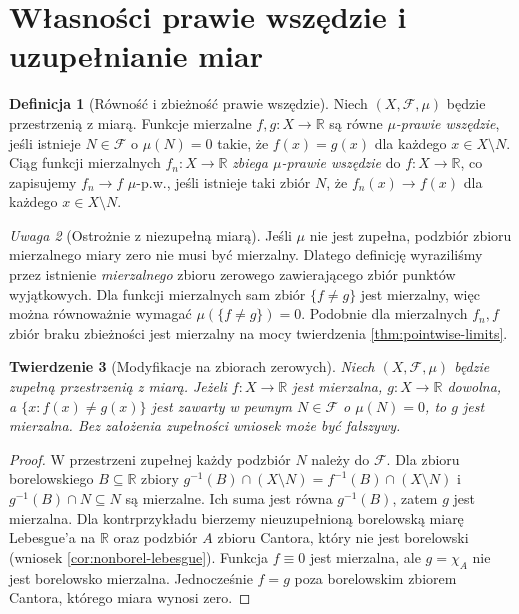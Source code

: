 \documentclass[11pt,a4paper,oneside]{book}
\numberwithin{equation}{chapter}
\theoremstyle{plain}
\newtheorem{twierdzenie}{Twierdzenie}[chapter]
\theoremstyle{definition}
\newtheorem{definicja}[twierdzenie]{Definicja}
\theoremstyle{remark}
\newtheorem{uwaga}[twierdzenie]{Uwaga}
\begin{document}
\section{Własności prawie wszędzie i uzupełnianie miar}

\begin{definicja}[Równość i zbieżność prawie wszędzie]
\label{def:ae-functions}
Niech $(X,\mathcal F,\mu)$ będzie przestrzenią z miarą.
Funkcje mierzalne $f,g:X\to\mathbb R$ są równe
\emph{$\mu$-prawie wszędzie}, jeśli istnieje
$N\in\mathcal F$ o $\mu(N)=0$ takie, że
$f(x)=g(x)$ dla każdego $x\in X\setminus N$.
Ciąg funkcji mierzalnych $f_n:X\to\mathbb R$
\emph{zbiega $\mu$-prawie wszędzie} do $f:X\to\mathbb R$,
co zapisujemy $f_n\to f$ $\mu$-p.w., jeśli istnieje
taki zbiór $N$, że $f_n(x)\to f(x)$ dla każdego
$x\in X\setminus N$.
\end{definicja}

\begin{uwaga}[Ostrożnie z niezupełną miarą]
Jeśli $\mu$ nie jest zupełna, podzbiór zbioru
mierzalnego miary zero nie musi być mierzalny.
Dlatego definicję wyraziliśmy przez istnienie
\emph{mierzalnego} zbioru zerowego zawierającego
zbiór punktów wyjątkowych. Dla funkcji mierzalnych
sam zbiór $\{f\ne g\}$ jest mierzalny, więc można
równoważnie wymagać $\mu(\{f\ne g\})=0$.
Podobnie dla mierzalnych $f_n,f$ zbiór braku
zbieżności jest mierzalny na mocy twierdzenia
\ref{thm:pointwise-limits}.
\end{uwaga}

\begin{twierdzenie}[Modyfikacje na zbiorach zerowych]
\label{thm:null-modifications}
Niech $(X,\mathcal F,\mu)$ będzie \emph{zupełną}
przestrzenią z miarą. Jeżeli $f:X\to\mathbb R$
jest mierzalna, $g:X\to\mathbb R$ dowolna,
a $\{x:f(x)\ne g(x)\}$ jest zawarty w pewnym
$N\in\mathcal F$ o $\mu(N)=0$, to $g$ jest mierzalna.
Bez założenia zupełności wniosek może być fałszywy.
\end{twierdzenie}
\begin{proof}
W przestrzeni zupełnej każdy podzbiór $N$ należy
do $\mathcal F$. Dla zbioru borelowskiego
$B\subseteq\mathbb R$ zbiory
$g^{-1}(B)\cap(X\setminus N)=f^{-1}(B)\cap(X\setminus N)$
i $g^{-1}(B)\cap N\subseteq N$ są mierzalne.
Ich suma jest równa $g^{-1}(B)$, zatem $g$ jest mierzalna.
Dla kontrprzykładu bierzemy nieuzupełnioną borelowską
miarę Lebesgue'a na $\mathbb R$ oraz podzbiór
$A$ zbioru Cantora, który nie jest borelowski
(wniosek \ref{cor:nonborel-lebesgue}).
Funkcja $f\equiv0$ jest mierzalna, ale
$g=\chi_A$ nie jest borelowsko mierzalna.
Jednocześnie $f=g$ poza borelowskim zbiorem
Cantora, którego miara wynosi zero.
\end{proof}
\end{document}
